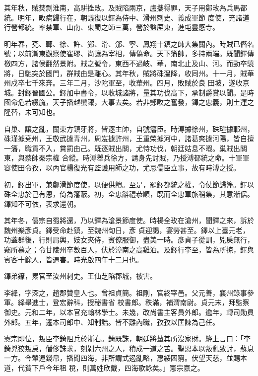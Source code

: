 \begin{pinyinscope}
 其年秋，賊焚剽淮南，高駢挫敗。及賊陷兩京，盧攜得罪，天子用鄭畋為兵馬都統。明年，畋病歸行在，朝議復以鐸為侍中、滑州刺史、義成軍節
 度使，充諸道行營都統。率禁軍、山南、東蜀之師三萬，營於盩厔東，進屯靈感寺。



 明年春，兗、鄆、徐、許、鄭、滑、邠、寧、鳳翔十鎮之師大集關內。時賊已僭名號；以前漸東觀察使崔璆、尚讓為宰相，傳偽命。天下籓帥，多持兩端。既聞鐸傳檄四方，諸侯翻然景附。賊之號令，東西不過岐、華，南北止及山、河。而勁卒驍將，日馳突於國門，群賊由是離心。其年秋，賊將硃溫降，收同州。十一月，賊華州戍卒七千來奔。三年二月，沙陀軍至，收華州。四月，敗賊於良
 田坡，遂收京城。封鐸晉國公。鐸加中書令，以收城諸將，量其功伐高下，承制爵賞以聞。是時國命危若綴旒，天子播越蠻陬，大事去矣。若非鄭畋之奮發，鐸之忠義，則土運之隆替，未可知也。



 自巢、讓之亂，關東方鎮牙將，皆逐主帥，自號籓臣。時溥據徐州，硃瑄據鄆州，硃瑾據兗州，王敬武據青州，周岌據許州，王重榮據河中，諸葛爽據河陽，皆自擅一籓，職貢不入，賞罰由己。既逐賊出關，尤恃功伐，朝廷姑息不暇。巢賊出關東，與蔡帥秦宗權
 合縱。時溥舉兵徐方，請身先討賊，乃授溥都統之命。十軍軍容使田令孜，以內官楊復光有監護用師之功，尤忌儒臣立事，故有時溥之授。



 初，鐸出軍，兼鄭滑節度使，以便供饋。至是，罷鐸都統之權，令仗節歸籓。鐸以硃全忠於己有恩，倚為籓蔽。初，全忠辭禮恭順，既而全忠軍旅稍集，其意漸倨。鐸知不可依，表求還朝。



 其年冬，僖宗自蜀將還，乃以鐸為滄景節度使。時楊全玫在滄州，聞鐸之來，訴於魏州樂彥貞。鐸受命赴鎮，至魏州旬日，彥
 貞迎謁，宴勞甚至。鐸以上臺元老，功蓋群後，行則肩輿，妓女夾侍，賓僚服御，盡美一時。彥貞子從訓，兇戾無行，竊所慕之；令甘陵州卒數百人，伏於漳南之高雞泊。及鐸行李至，皆為所掠，鐸與賓客十餘人，皆遇害。時光啟四年十二月也。



 鐸弟鐐，累官至汝州刺史。王仙芝陷郡城，被害。



 李絳，字深之，趙郡贊皇人也。曾祖貞簡。祖剛，官終宰邑。父元善，襄州錄事參軍。絳舉進士，登宏辭科，授秘書省
 校書郎。秩滿，補渭南尉。貞元末，拜監察御史。元和二年，以本官充翰林學士。未幾，改尚書主客員外郎。逾年，轉司勛員外郎。五年，遷本司郎中、知制誥。皆不離內職，孜孜以匡諫為己任。



 憲宗即位，叛臣李錡阻兵於浙右。錡既誅，朝廷將輦其所沒家財。絳上言曰：「李錡兇狡叛戾，僭侈誅求，刻剝六州之人，積成一道之苦。聖恩本以叛亂致討，蘇息一方。今輦運錢帛，播聞四海，非所謂式遏亂略，惠綏困窮。伏望天慈，並賜本道，代貧下戶今年租
 稅，則萬姓欣戴，四海歌詠矣。」憲宗嘉之。




\end{pinyinscope}
